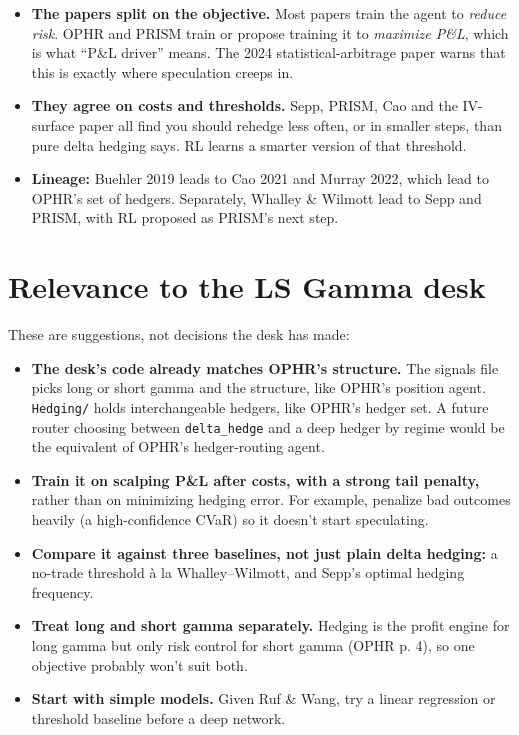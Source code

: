 \documentclass{article}
\begin{document}
\begin{itemize}

\item \textbf{The papers split on the objective.} Most papers train the agent to \emph{reduce risk}. OPHR and PRISM train or propose training it to \emph{maximize P\&L}, which is what ``P\&L driver'' means. The 2024 statistical-arbitrage paper warns that this is exactly where speculation creeps in.

\item \textbf{They agree on costs and thresholds.} Sepp, PRISM, Cao and the IV-surface paper all find you should rehedge less often, or in smaller steps, than pure delta hedging says. RL learns a smarter version of that threshold.

\item \textbf{Lineage:} Buehler 2019 leads to Cao 2021 and Murray 2022, which lead to OPHR's set of hedgers. Separately, Whalley \& Wilmott lead to Sepp and PRISM, with RL proposed as PRISM's next step.

\end{itemize}

\section{Relevance to the LS Gamma desk}

These are suggestions, not decisions the desk has made:

\begin{itemize}

\item \textbf{The desk's code already matches OPHR's structure.} The signals file picks long or short gamma and the structure, like OPHR's position agent. \texttt{Hedging/\allowbreak{}} holds interchangeable hedgers, like OPHR's hedger set. A future router choosing between \texttt{delta\_\allowbreak{}hedge} and a deep hedger by regime would be the equivalent of OPHR's hedger-routing agent.

\item \textbf{Train it on scalping P\&L after costs, with a strong tail penalty,} rather than on minimizing hedging error. For example, penalize bad outcomes heavily (a high-confidence CVaR) so it doesn't start speculating.

\item \textbf{Compare it against three baselines, not just plain delta hedging:} a no-trade threshold à la Whalley--Wilmott, and Sepp's optimal hedging frequency.

\item \textbf{Treat long and short gamma separately.} Hedging is the profit engine for long gamma but only risk control for short gamma (OPHR p. 4), so one objective probably won't suit both.

\item \textbf{Start with simple models.} Given Ruf \& Wang, try a linear regression or threshold baseline before a deep network.

\end{itemize}
\end{document}
